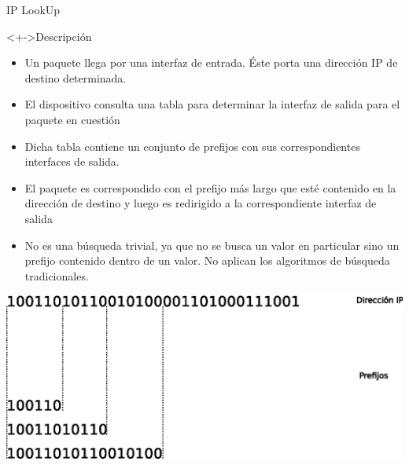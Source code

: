 \documentclass[xcolor=dvipsnames]{beamer}
\begin{document}
\begin{frame}{IP LookUp}
 \begin{block}<+->{Descripción}   
    \begin{itemize}
      \scriptsize
      \item Un paquete llega por una interfaz de entrada. Éste porta una dirección IP de destino determinada.
      \item El dispositivo consulta una tabla para determinar la interfaz de salida para el paquete en cuestión
      \item Dicha tabla contiene un conjunto de prefijos con sus correspondientes interfaces de salida.
      \item El paquete es correspondido con el prefijo más largo que esté contenido en la dirección de destino y luego es redirigido  a la correspondiente interfaz de salida
      \item No es una búsqueda trivial, ya que no se busca un valor en particular sino un prefijo contenido dentro de un valor. No aplican los algoritmos de búsqueda tradicionales.   
    \end{itemize}
\center 
\includegraphics[scale=0.50]{figures/prefijos.eps}
  \end{block}
\end{frame}
\end{document}

